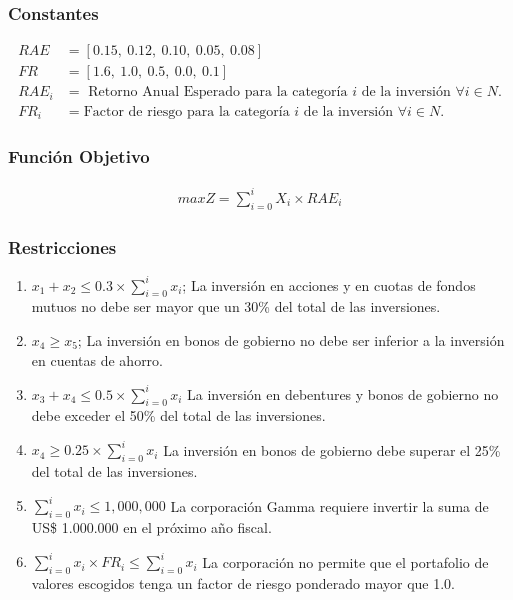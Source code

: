 \documentclass[a4paper,12pt]{article}
\begin{document}
\subsubsection{Constantes}
\begin{equation*}
\begin{split}
	RAE &= [0.15,\ 0.12,\ 0.10,\ 0.05,\ 0.08] \\
	FR & = [1.6,\ 1.0,\ 0.5,\ 0.0,\ 0.1] \\
	RAE_i &= \text{ Retorno Anual Esperado para la categoría } i \text{ de la inversión } \forall i \in N. \\
	FR_i &= \text{Factor de riesgo para la categoría } i \text{ de la inversión } \forall i \in N.
\end{split}
\end{equation*}
\subsubsection{Función Objetivo}
\begin{equation*}
\begin{split}
	maxZ = \sum_{i = 0}^{i}X_i\times RAE_i
\end{split}
\end{equation*}
\subsubsection{Restricciones}
\begin{enumerate}
	\item $x_1 + x_2 \leq 0.3\times\sum_{i = 0}^{i}x_i$; La inversión en acciones y en cuotas de fondos mutuos no debe ser mayor que un
	30\% del total de  las  inversiones.
	\item $x_4 \geq x_5$; La  inversión  en  bonos  de  gobierno  no  debe  ser  inferior  a  la  inversión  en  cuentas  de  ahorro.
	\item $x_3 + x_4 \leq 0.5\times\sum_{i = 0}^{i}x_i$ La inversión en debentures y bonos de gobierno no debe exceder el 50\% del total de las inversiones.
	\item $x_4 \geq 0.25\times\sum_{i = 0}^{i}x_i$ La 
	inversión en bonos de gobierno debe superar el 25\%	del total de las inversiones.
	\item $\sum_{i = 0}^{i}x_i \leq 1,000,000$ La corporación Gamma    requiere invertir  la  suma  de  US\$  1.000.000  en el  próximo  año  fiscal. 
	\item $\sum_{i = 0}^{i}x_i\times FR_i \leq \sum_{i = 0}^{i}x_i$  La  corporación  no  permite  que el  portafolio  de  valores  escogidos  tenga  un  factor de  riesgo ponderado mayor que 1.0. 
\end{enumerate}
\end{document}
